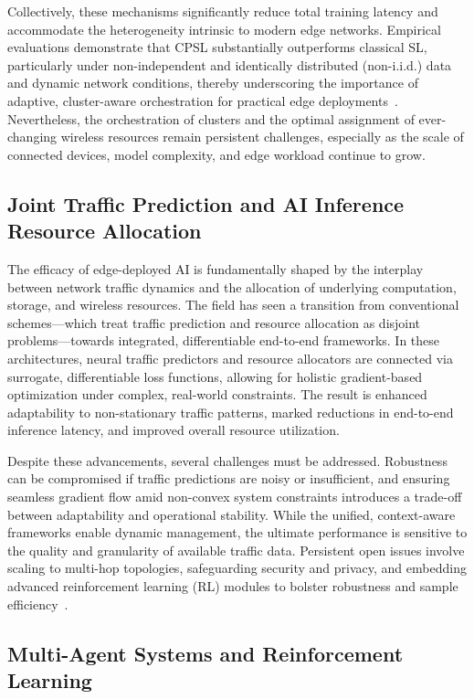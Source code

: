 Collectively, these mechanisms significantly reduce total training latency and accommodate the heterogeneity intrinsic to modern edge networks. Empirical evaluations demonstrate that CPSL substantially outperforms classical SL, particularly under non-independent and identically distributed (non-i.i.d.) data and dynamic network conditions, thereby underscoring the importance of adaptive, cluster-aware orchestration for practical edge deployments~\cite{ref47}. Nevertheless, the orchestration of clusters and the optimal assignment of ever-changing wireless resources remain persistent challenges, especially as the scale of connected devices, model complexity, and edge workload continue to grow.

\subsection{Joint Traffic Prediction and AI Inference Resource Allocation}

The efficacy of edge-deployed AI is fundamentally shaped by the interplay between network traffic dynamics and the allocation of underlying computation, storage, and wireless resources. The field has seen a transition from conventional schemes—which treat traffic prediction and resource allocation as disjoint problems—towards integrated, differentiable end-to-end frameworks. In these architectures, neural traffic predictors and resource allocators are connected via surrogate, differentiable loss functions, allowing for holistic gradient-based optimization under complex, real-world constraints. The result is enhanced adaptability to non-stationary traffic patterns, marked reductions in end-to-end inference latency, and improved overall resource utilization.

Despite these advancements, several challenges must be addressed. Robustness can be compromised if traffic predictions are noisy or insufficient, and ensuring seamless gradient flow amid non-convex system constraints introduces a trade-off between adaptability and operational stability. While the unified, context-aware frameworks enable dynamic management, the ultimate performance is sensitive to the quality and granularity of available traffic data. Persistent open issues involve scaling to multi-hop topologies, safeguarding security and privacy, and embedding advanced reinforcement learning (RL) modules to bolster robustness and sample efficiency~\cite{ref48}.

\subsection{Multi-Agent Systems and Reinforcement Learning}

